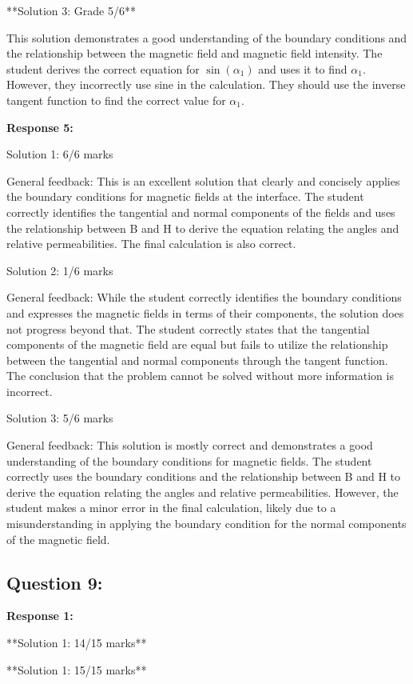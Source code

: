 \documentclass[a4paper,11pt]{article}
\begin{document}
**Solution 3: Grade 5/6**

This solution demonstrates a good understanding of the boundary conditions and the relationship between the magnetic field and magnetic field intensity. The student derives the correct equation for \(\sin(\alpha_{1})\) and uses it to find \(\alpha_{1}\). However, they incorrectly use sine in the calculation. They should use the inverse tangent function to find the correct value for \(\alpha_{1}\).

\textbf{Response 5:}

Solution 1: 6/6 marks

General feedback: This is an excellent solution that clearly and concisely applies the boundary conditions for magnetic fields at the interface. The student correctly identifies the tangential and normal components of the fields and uses the relationship between B and H to derive the equation relating the angles and relative permeabilities. The final calculation is also correct.

Solution 2: 1/6 marks

General feedback: While the student correctly identifies the boundary conditions and expresses the magnetic fields in terms of their components, the solution does not progress beyond that. The student correctly states that the tangential components of the magnetic field are equal but fails to utilize the relationship between the tangential and normal components through the tangent function. The conclusion that the problem cannot be solved without more information is incorrect.

Solution 3: 5/6 marks

General feedback: This solution is mostly correct and demonstrates a good understanding of the boundary conditions for magnetic fields. The student correctly uses the boundary conditions and the relationship between B and H to derive the equation relating the angles and relative permeabilities. However, the student makes a minor error in the final calculation, likely due to a misunderstanding in applying the boundary condition for the normal components of the magnetic field.

\subsection*{Question 9:}

\textbf{Response 1:}

**Solution 1: 14/15 marks**

**Solution 1: 15/15 marks**
\end{document}
